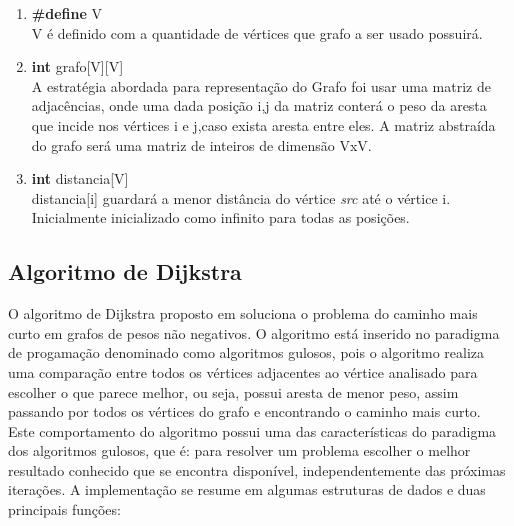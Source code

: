 \documentclass[12pt]{article}
\begin{document}
\begin{enumerate}
\item \textbf{\#define} V
\\
V é definido com a quantidade de vértices que grafo a ser usado possuirá.
\\
\item \textbf{int} grafo[V][V]
\\
A estratégia abordada para representação do Grafo foi usar uma matriz de adjacências, onde uma dada posição i,j da matriz conterá o peso da aresta que incide nos vértices i e j,caso exista aresta entre eles. A matriz abstraída do grafo será uma  matriz de inteiros  de dimensão VxV.
\\
\item \textbf{int} distancia[V]
\\
distancia[i] guardará a menor distância do vértice \textit{src} até o vértice i. Inicialmente inicializado como infinito para todas as posições.
\\
\end{enumerate}

\subsection{Algoritmo de Dijkstra} \label{sec:dijkstra}

O algoritmo de Dijkstra proposto em \cite{Dijkstra1959} soluciona o problema do caminho mais curto em grafos de 
pesos não negativos. O algoritmo está inserido no paradigma de progamação denominado como algoritmos gulosos, pois o algoritmo  realiza uma
comparação entre todos os vértices adjacentes ao vértice analisado para  escolher o que parece melhor, ou seja, possui aresta de menor peso, assim passando por todos os vértices do grafo e encontrando o caminho mais
curto. Este comportamento do algoritmo possui uma  das características do paradigma dos algoritmos gulosos, que é: para resolver um problema escolher o melhor resultado conhecido que se encontra disponível, independentemente das próximas iterações.
A implementação se resume em algumas estruturas de dados e duas principais funções:
 
\end{document}
